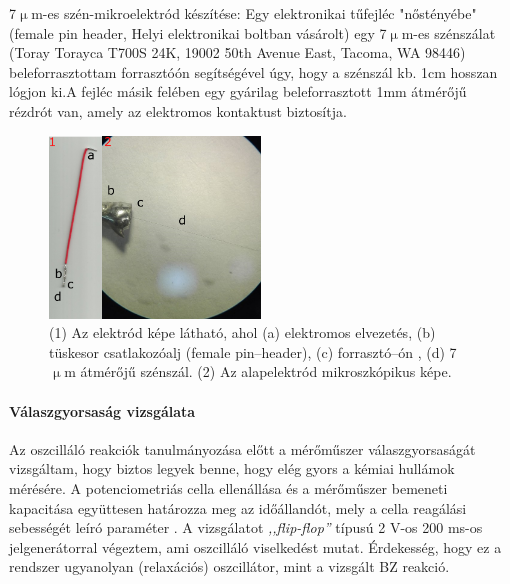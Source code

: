 7$\upmu$m-es szén-mikroelektród készítése:
Egy elektronikai tűfejléc "nőstényébe" (female pin header, Helyi elektronikai boltban vásárolt) egy 7$\upmu$m-es szénszálat (Toray Torayca T700S 24K, 19002 50th Avenue East, Tacoma, WA 98446) beleforrasztottam forrasztóón segítségével úgy, hogy a szénszál kb. 1cm hosszan lógjon ki.A fejléc másik felében egy gyárilag beleforrasztott 1mm átmérőjű rézdrót van, amely az elektromos kontaktust biztosítja.
\begin{figure}[h]
\centering
\includegraphics[width=0.5\textwidth]{img/szenmikro.png}
\caption{(1) Az elektród képe látható, ahol (a) elektromos elvezetés, (b) tüskesor csatlakozóalj (female pin--header), (c) forrasztó--ón , (d) 7 $\upmu$m átmérőjű szénszál. (2) Az alapelektród mikroszkópikus képe.}
\label{fig:ionophores}
\end{figure}

\paragraph{Válaszgyorsaság vizsgálata}

Az oszcilláló reakciók tanulmányozása előtt a mérőműszer válaszgyorsaságát vizsgáltam, hogy biztos legyek benne, hogy elég gyors a kémiai hullámok mérésére. A potenciometriás cella ellenállása és a mérőműszer bemeneti kapacitása együttesen határozza meg az időállandót, mely a cella reagálási sebességét leíró paraméter \cite{kiss2015deconvolution}. A vizsgálatot \emph{,,flip-flop''} típusú 2 V-os 200 ms-os jelgenerátorral végeztem, ami oszcilláló viselkedést mutat. Érdekesség, hogy ez a rendszer ugyanolyan (relaxációs) oszcillátor, mint a vizsgált BZ reakció.

